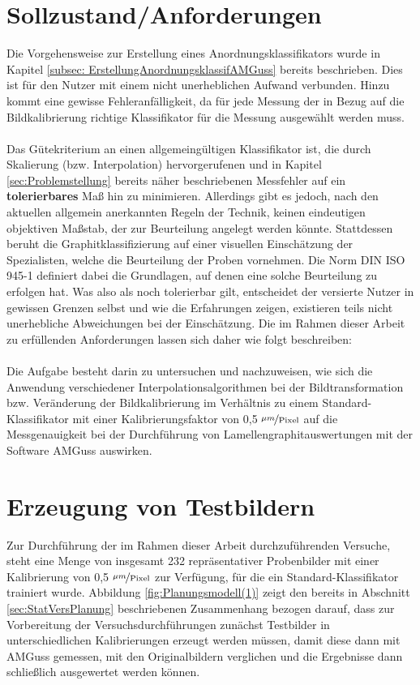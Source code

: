 \documentclass[
fontsize=10pt, 
listof = totoc,
parskip = half	
]{report}
\begin{document}
\section{Sollzustand/Anforderungen}
\label{sec:DefAnforderungenAnordnKlas}
Die Vorgehensweise zur Erstellung eines Anordnungsklassifikators wurde in Kapitel \ref{subsec: ErstellungAnordnungsklassifAMGuss} bereits beschrieben. Dies ist für den Nutzer mit einem nicht unerheblichen Aufwand verbunden. Hinzu kommt eine gewisse Fehleranfälligkeit, da für jede Messung der in Bezug auf die Bildkalibrierung richtige Klassifikator für die Messung ausgewählt werden muss.
\\\\
\noindent Das Gütekriterium an einen allgemeingültigen Klassifikator ist, die durch Skalierung (bzw. Interpolation) hervorgerufenen und in Kapitel \ref{sec:Problemstellung} bereits näher beschriebenen Messfehler auf ein \textbf{tolerierbares} Maß hin zu minimieren. Allerdings gibt es jedoch, nach den aktuellen allgemein anerkannten Regeln der Technik, keinen eindeutigen objektiven Maßstab, der zur Beurteilung angelegt werden könnte. Stattdessen beruht die Graphitklassifizierung auf einer visuellen Einschätzung der Spezialisten, welche die Beurteilung der Proben vornehmen. Die Norm DIN ISO 945-1 definiert dabei die Grundlagen, auf denen eine solche Beurteilung zu erfolgen hat. Was also als noch tolerierbar gilt, entscheidet der versierte Nutzer in gewissen Grenzen selbst und wie die Erfahrungen zeigen, existieren teils nicht unerhebliche Abweichungen bei der Einschätzung. Die im Rahmen dieser Arbeit zu erfüllenden Anforderungen lassen sich daher wie folgt beschreiben:
\\\\
\noindent Die Aufgabe besteht darin zu untersuchen und nachzuweisen, wie sich die Anwendung verschiedener Interpolationsalgorithmen bei der Bildtransformation bzw. Veränderung der Bildkalibrierung im Verhältnis zu einem Standard-Klassifikator mit einer Kalibrierungsfaktor von 0,5 $\nicefrac{\mu m}{\text{Pixel}}$ auf die Messgenauigkeit bei der Durchführung von Lamellengraphitauswertungen mit der Software AMGuss auswirken. 

\section{Erzeugung von Testbildern}
\label{sec:ErzeugungVonBildern}

Zur Durchführung der im Rahmen dieser Arbeit durchzuführenden Versuche, steht eine Menge von insgesamt 232 repräsentativer Probenbilder mit einer Kalibrierung von 0,5 $\nicefrac{\mu m}{\text{Pixel}}$ zur Verfügung, für die ein Standard-Klassifikator trainiert wurde. Abbildung \ref{fig:Planungsmodell(1)} zeigt den bereits in Abschnitt \ref{sec:StatVersPlanung} beschriebenen Zusammenhang bezogen darauf, dass zur Vorbereitung der Versuchsdurchführungen zunächst Testbilder in unterschiedlichen Kalibrierungen erzeugt werden müssen, damit diese dann mit AMGuss gemessen, mit den Originalbildern verglichen und die Ergebnisse dann schließlich ausgewertet werden können.
\end{document}
